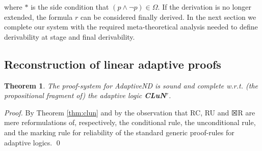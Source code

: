 \documentclass[]{article}
\newtheorem{theorem}{Theorem}
\begin{document}
where $*$ is the side condition that $(p\wedge \neg p)\in \Omega$. If the derivation is no longer extended, the formula $r$ can be considered finally derived. In the next section we complete our system with the required meta-theoretical analysis needed to define derivability at stage and final derivability.

\subsection{Reconstruction of linear adaptive proofs}


\begin{theorem}\label{thm:clunr}
	The proof-system for \textsf{AdaptiveND} is sound and complete w.r.t. (the propositional fragment of) the adaptive logic \textbf{CLuN$^r$}.
\end{theorem}
\noindent\textsl{Proof.} By Theorem \ref{thm:clun} and by the observation that {\sf RC}, {\sf RU} and  $\XBox${\sf R}  are mere reformulations of, respectively, the conditional rule, the unconditional rule, and the marking rule for reliability of the standard generic proof-rules for adaptive logics.
\qed
\end{document}
